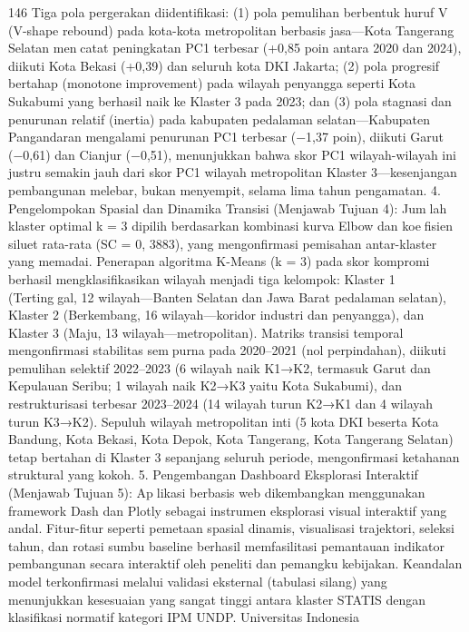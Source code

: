 146
Tiga pola pergerakan diidentifikasi: (1) pola pemulihan berbentuk huruf V (V-shape
rebound) pada kota-kota metropolitan berbasis jasa—Kota Tangerang Selatan mencatat peningkatan PC1 terbesar (+0,85 poin antara 2020 dan 2024), diikuti Kota
Bekasi (+0,39) dan seluruh kota DKI Jakarta; (2) pola progresif bertahap (monotone
improvement) pada wilayah penyangga seperti Kota Sukabumi yang berhasil naik
ke Klaster 3 pada 2023; dan (3) pola stagnasi dan penurunan relatif (inertia) pada
kabupaten pedalaman selatan—Kabupaten Pangandaran mengalami penurunan PC1
terbesar (−1,37 poin), diikuti Garut (−0,61) dan Cianjur (−0,51), menunjukkan
bahwa skor PC1 wilayah-wilayah ini justru semakin jauh dari skor PC1 wilayah
metropolitan Klaster 3—kesenjangan pembangunan melebar, bukan menyempit,
selama lima tahun pengamatan.
4. Pengelompokan Spasial dan Dinamika Transisi (Menjawab Tujuan 4): Jumlah klaster optimal k = 3 dipilih berdasarkan kombinasi kurva Elbow dan koefisien siluet rata-rata (SC = 0, 3883), yang mengonfirmasi pemisahan antar-klaster
yang memadai. Penerapan algoritma K-Means (k = 3) pada skor kompromi
berhasil mengklasifikasikan wilayah menjadi tiga kelompok: Klaster 1 (Tertinggal, 12 wilayah—Banten Selatan dan Jawa Barat pedalaman selatan), Klaster 2
(Berkembang, 16 wilayah—koridor industri dan penyangga), dan Klaster 3 (Maju,
13 wilayah—metropolitan). Matriks transisi temporal mengonfirmasi stabilitas sempurna pada 2020–2021 (nol perpindahan), diikuti pemulihan selektif 2022–2023
(6 wilayah naik K1→K2, termasuk Garut dan Kepulauan Seribu; 1 wilayah naik
K2→K3 yaitu Kota Sukabumi), dan restrukturisasi terbesar 2023–2024 (14 wilayah
turun K2→K1 dan 4 wilayah turun K3→K2). Sepuluh wilayah metropolitan inti
(5 kota DKI beserta Kota Bandung, Kota Bekasi, Kota Depok, Kota Tangerang,
Kota Tangerang Selatan) tetap bertahan di Klaster 3 sepanjang seluruh periode,
mengonfirmasi ketahanan struktural yang kokoh.
5. Pengembangan Dashboard Eksplorasi Interaktif (Menjawab Tujuan 5): Aplikasi berbasis web dikembangkan menggunakan framework Dash dan Plotly sebagai
instrumen eksplorasi visual interaktif yang andal. Fitur-fitur seperti pemetaan spasial
dinamis, visualisasi trajektori, seleksi tahun, dan rotasi sumbu baseline berhasil
memfasilitasi pemantauan indikator pembangunan secara interaktif oleh peneliti
dan pemangku kebijakan. Keandalan model terkonfirmasi melalui validasi eksternal
(tabulasi silang) yang menunjukkan kesesuaian yang sangat tinggi antara klaster
STATIS dengan klasifikasi normatif kategori IPM UNDP.
Universitas Indonesia

